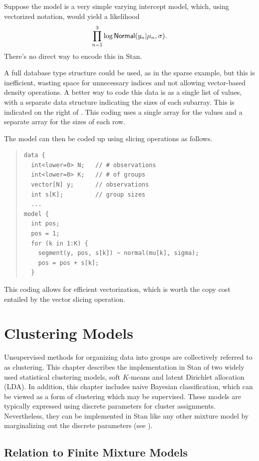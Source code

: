 Suppose the model is a very simple varying intercept model, which,
using vectorized notation, would yield a likelihood
\[
\prod_{n=1}^3 \log \mbox{\sf Normal}(y_n | \mu_n, \sigma).
\]
There's no direct way to encode this in Stan.

A full database type structure could be used, as in the sparse
example, but this is inefficient, wasting space for unnecessary
indices and not allowing vector-based density operations.  A better
way to code this data is as a single list of values, with a separate
data structure indicating the sizes of each subarray.  This is
indicated on the right of .  This coding uses a
single array for the values and a separate array for the sizes of each
row.

The model can then be coded up using slicing operations as follows.
\begin{quote}
\begin{Verbatim}
data {
  int<lower=0> N;   // # observations
  int<lower=0> K;   // # of groups
  vector[N] y;      // observations
  int s[K];         // group sizes
  ...
model {
  int pos;
  pos = 1;
  for (k in 1:K) {
    segment(y, pos, s[k]) ~ normal(mu[k], sigma);
    pos = pos + s[k];
  }
\end{Verbatim}
\end{quote}
%
This coding allows for efficient vectorization, which is worth the
copy cost entailed by the  vector slicing operation.


\chapter{Clustering Models}\label{clustering.chapter}

\noindent
Unsupervised methods for organizing data into groups are collectively
referred to as clustering.  This chapter describes the implementation
in Stan of two widely used statistical clustering models, soft
$K$-means and latent Dirichlet allocation (LDA).  In addition, this
chapter includes naive Bayesian classification, which can be viewed as
a form of clustering which may be supervised.  These models are
typically expressed using discrete parameters for cluster assignments.
Nevertheless, they can be implemented in Stan like any other mixture
model by marginalizing out the discrete parameters (see
).

\section{Relation to Finite Mixture Models}

